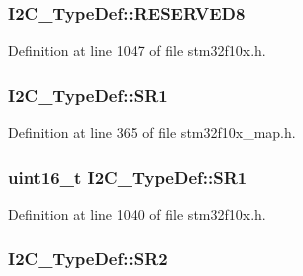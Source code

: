 \subsubsection[{\texorpdfstring{R\+E\+S\+E\+R\+V\+E\+D8}{RESERVED8}}]{ I2\+C\+\_\+\+Type\+Def\+::\+R\+E\+S\+E\+R\+V\+E\+D8}\hypertarget{struct_i2_c___type_def_a6e762751c9d5a1e41efb6033a26d8ed8}{}\label{struct_i2_c___type_def_a6e762751c9d5a1e41efb6033a26d8ed8}


Definition at line 1047 of file stm32f10x.\+h.

\subsubsection[{\texorpdfstring{S\+R1}{SR1}}]{ I2\+C\+\_\+\+Type\+Def\+::\+S\+R1}\hypertarget{struct_i2_c___type_def_a1126d0729faab9084ca6362e8605c634}{}\label{struct_i2_c___type_def_a1126d0729faab9084ca6362e8605c634}


Definition at line 365 of file stm32f10x\+\_\+map.\+h.

\subsubsection[{\texorpdfstring{S\+R1}{SR1}}]{ {\bf uint16\+\_\+t} I2\+C\+\_\+\+Type\+Def\+::\+S\+R1}\hypertarget{struct_i2_c___type_def_ae1602cd1c9cad449523099c97138f991}{}\label{struct_i2_c___type_def_ae1602cd1c9cad449523099c97138f991}


Definition at line 1040 of file stm32f10x.\+h.

\subsubsection[{\texorpdfstring{S\+R2}{SR2}}]{ I2\+C\+\_\+\+Type\+Def\+::\+S\+R2}\hypertarget{struct_i2_c___type_def_a0c06f70ea89c84b49025dc834bb1dc54}{}\label{struct_i2_c___type_def_a0c06f70ea89c84b49025dc834bb1dc54}


